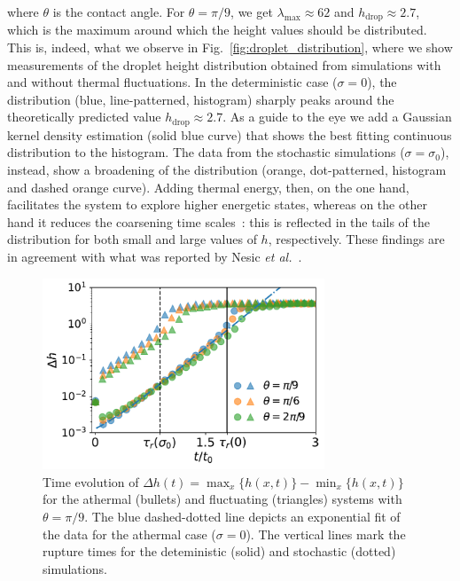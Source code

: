 where $\theta$ is the contact angle. 
For $\theta = \pi/9$, we get $\lambda_{\text{max}} \approx 62$ and $h_{\text{drop}} \approx 2.7$, which is the maximum around which the height values should be distributed.
This is, indeed, what we observe in Fig.~\ref{fig:droplet_distribution}, where we show measurements of the droplet height distribution obtained from simulations with and without thermal fluctuations.
In the deterministic case ($\sigma=0$), the distribution (blue, line-patterned, histogram) sharply peaks around the theoretically predicted value $h_{\text{drop}} \approx 2.7$. 
As a guide to the eye we add a Gaussian kernel density estimation (solid blue curve) that shows the best fitting continuous distribution to the histogram. 
The data from the stochastic simulations ($\sigma = \sigma_0$), instead, show a broadening of the distribution (orange, dot-patterned, histogram and dashed orange curve).
Adding thermal energy, then, on the one hand, facilitates the system to explore higher energetic states, whereas on the other hand it reduces the coarsening time scales~\cite{grunThinFilmFlowInfluenced2006}: this is reflected in the tails of the distribution for both small and large values of $h$, respectively.
These findings are in agreement with what was reported by Nesic \textit{et al.}~\cite{nesicFullyNonlinearDynamics2015}.
\begin{figure}
    \centering
    \includegraphics[width = 0.75\textwidth]{graphics/Correct_t0_normed_delta_h_evo_seminar.pdf}
    \caption{Time evolution of $\Delta h(t) = \max_x\{h(x,t)\} - \min_x\{h(x,t)\}$ for the athermal (bullets) and fluctuating (triangles) systems with $\theta=\pi/9$.
    The blue dashed-dotted line depicts an exponential fit of the data for the athermal case ($\sigma=0$).
    The vertical lines mark the rupture times for the deteministic (solid) and stochastic (dotted) simulations.}
    \label{fig:delta_heigth_evo}
\end{figure}

